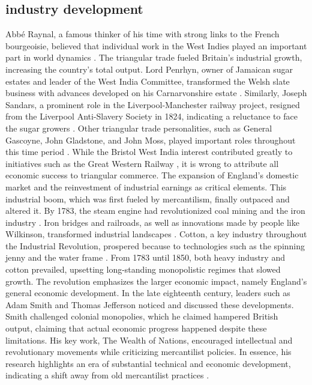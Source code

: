 \subsection{industry development}
Abbé Raynal, a famous thinker of his time with strong links to the French bourgeoisie, believed that individual work in the West Indies played an important part in world dynamics . The triangular trade fueled Britain's industrial growth, increasing the country's total output. Lord Penrhyn, owner of Jamaican sugar estates and leader of the West India Committee, transformed the Welsh slate business with advances developed on his Carnarvonshire estate . Similarly, Joseph Sandars, a prominent role in the Liverpool-Manchester railway project, resigned from the Liverpool Anti-Slavery Society in 1824, indicating a reluctance to face the sugar growers . Other triangular trade personalities, such as General Gascoyne, John Gladstone, and John Moss, played important roles throughout this time period . While the Bristol West India interest contributed greatly to initiatives such as the Great Western Railway , it is wrong to attribute all economic success to triangular commerce. The expansion of England's domestic market and the reinvestment of industrial earnings as critical elements. This industrial boom, which was first fueled by mercantilism, finally outpaced and altered it. By 1783, the steam engine had revolutionized coal mining and the iron industry . Iron bridges and railroads, as well as innovations made by people like Wilkinson, transformed industrial landscapes . Cotton, a key industry throughout the Industrial Revolution, prospered because to technologies such as the spinning jenny and the water frame . From 1783 until 1850, both heavy industry and cotton prevailed, upsetting long-standing monopolistic regimes that slowed growth. The revolution emphasizes the larger economic impact, namely England's general economic development. In the late eighteenth century, leaders such as Adam Smith and Thomas Jefferson noticed and discussed these developments. Smith challenged colonial monopolies, which he claimed hampered British output, claiming that actual economic progress happened despite these limitations. His key work, The Wealth of Nations, encouraged intellectual and revolutionary movements while criticizing mercantilist policies. In essence, his research highlights an era of substantial technical and economic development, indicating a shift away from old mercantilist practices .